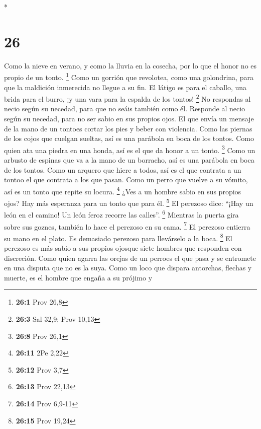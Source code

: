 \begin{paracol}{2}
\begin{otherlanguage}{english}
\end{otherlanguage}

\switchcolumn[0]*

\hypertarget{section-50}{%
\section{26}\label{section-50}}

 Como la nieve en verano, y como la lluvia en la cosecha,
por lo que el honor no es propio de un tonto. \footnote{\textbf{26:1}
  Prov 26,8}  Como un gorrión que revolotea, como una
golondrina, para que la maldición inmerecida no llegue a su fin.
 El látigo es para el caballo, una brida para el burro, ¡y
una vara para la espalda de los tontos! \footnote{\textbf{26:3} Sal
  32,9; Prov 10,13}  No respondas al necio según su
necedad, para que no seáis también como él.  Responde al
necio según su necedad, para no ser sabio en sus propios ojos.
 El que envía un mensaje de la mano de un tontoes cortar
los pies y beber con violencia.  Como las piernas de los
cojos que cuelgan sueltas, así es una parábola en boca de los tontos.
 Como quien ata una piedra en una honda, así es el que da
honor a un tonto. \footnote{\textbf{26:8} Prov 26,1}  Como
un arbusto de espinas que va a la mano de un borracho, así es una
parábola en boca de los tontos.  Como un arquero que
hiere a todos, así es el que contrata a un tontoo el que contrata a los
que pasan.  Como un perro que vuelve a su vómito, así es
un tonto que repite su locura. \footnote{\textbf{26:11} 2Pe 2,22}
 ¿Ves a un hombre sabio en sus propios ojos? Hay más
esperanza para un tonto que para él. \footnote{\textbf{26:12} Prov 3,7}
 El perezoso dice: ``¡Hay un león en el camino! Un león
feroz recorre las calles''. \footnote{\textbf{26:13} Prov 22,13}
 Mientras la puerta gira sobre sus goznes, también lo
hace el perezoso en su cama. \footnote{\textbf{26:14} Prov 6,9-11}
 El perezoso entierra su mano en el plato. Es demasiado
perezoso para llevárselo a la boca. \footnote{\textbf{26:15} Prov 19,24}
 El perezoso es más sabio a sus propios ojosque siete
hombres que responden con discreción.  Como quien agarra
las orejas de un perroes el que pasa y se entromete en una disputa que
no es la suya.  Como un loco que dispara antorchas,
flechas y muerte,  es el hombre que engaña a su prójimo y

\end{paracol}
